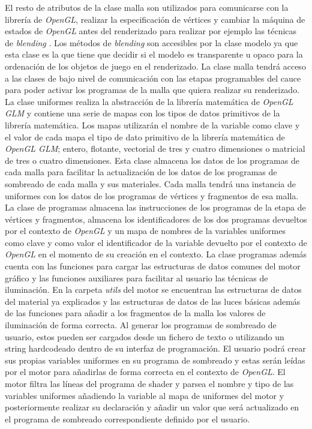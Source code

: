 \documentclass[a4paper]{book}
\begin{document}
El resto de atributos de la clase malla son utilizados para comunicarse con la librería de \textit{OpenGL}, realizar la especificación de
vértices y cambiar la máquina de estados de \textit{OpenGL} antes del renderizado para realizar por ejemplo las técnicas de 
\textit{blending} \cite{article:_transparnet_shadows}. Los métodos de \textit{blending} son accesibles por la clase modelo ya que esta
clase es la que tiene que decidir si el modelo es transparente u opaco
para la ordenación de los objetos de juego en el renderizado. La clase malla tendrá acceso a las clases de bajo nivel de comunicación
con las etapas programables del cauce para poder activar los programas de la malla que quiera realizar su renderizado. La clase uniformes
realiza la abstracción de la librería matemática de \textit{OpenGL GLM} y contiene una serie de mapas con los tipos de datos
primitivos de la librería matemática. Los mapas utilizarán el nombre de la variable como clave y el valor de cada mapa el tipo de dato primitivo
de la librería matemática de \textit{OpenGL GLM}; entero, flotante, vectorial de tres y cuatro dimensiones o matricial de tres o cuatro dimensiones.
Esta clase almacena los datos de los programas de cada malla para facilitar la actualización de los datos de los programas de
sombreado de cada malla y sus materiales. Cada malla tendrá una instancia de uniformes con los datos de los programas de vértices
y fragmentos de esa malla. La clase de programas almacena las instrucciones de los programas de la etapa de vértices y fragmentos, almacena
los identificadores de los dos programas devueltos por el contexto de \textit{OpenGL} y un mapa de nombres de la variables uniformes como
clave y como valor el identificador de la variable devuelto por el contexto de \textit{OpenGL} en el momento de su creación en el contexto. La
clase programas además cuenta con las funciones para cargar las estructuras de datos comunes del motor gráfico y las funciones auxiliares para
facilitar al usuario las técnicas de iluminación. En la carpeta \textit{utils} del motor se encuentran las estructuras de datos del material ya
explicados y las estructuras de datos de las luces básicas además de las funciones para añadir a los fragmentos de la malla los valores de iluminación de forma correcta. Al
generar los programas de sombreado de usuario, estos pueden ser cargados desde un fichero de texto o utilizando un string hardcodeado
dentro de su interfaz de programación. El usuario podrá crear sus propias variables uniformes en su programa de sombreado y estas serán
leídas por el motor para añadirlas de forma correcta en el contexto de \textit{OpenGL}. El motor filtra las líneas del programa de shader y parsea
el nombre y tipo de las variables uniformes añadiendo la variable al mapa de uniformes del motor y posteriormente realizar su declaración
y añadir un valor que será actualizado en el programa de sombreado correspondiente definido por el usuario.
\end{document}
